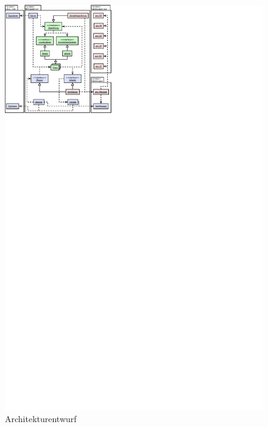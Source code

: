 \documentclass[
	12pt,
	table,
	bigheadings,
	ngerman,
	a4paper,
	BCOR5mm,
	DIV14,
	1.1headlines,
	pagesize,
	oneside,
	openright,
	titlepage,
	headsepline,
	nochapterprefix,
	bibtotoc,
	tocindent,
	listsindent,
	pointlessnumbers,
	cleardoubleempty,
	fleqn,
	halfparskip
]{scrbook}
\begin{document}
		
		\begin{figure}[H]
			\centering
			\includegraphics[width=2.0\textwidth]{dia/architecture}
			\caption{Architekturentwurf}
			\label{draft:architecture}
		\end{figure}
		
\end{document}
